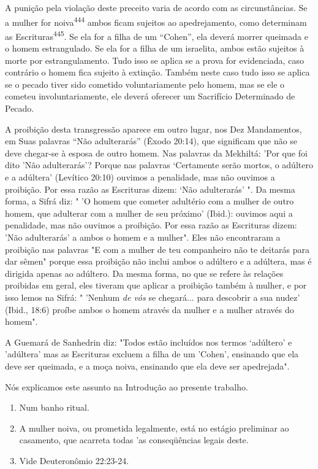 A punição pela violação deste preceito varia de acordo com as
cir­cunstâncias. Se a mulher for noiva\textsuperscript{444} ambos ficam
sujeitos ao apedrejamen­to, como determinam as
Escrituras\textsuperscript{445}. Se ela for a filha de um ``Cohen'', ela
deverá morrer queimada e o homem estrangulado. Se ela for a filha de um
is­raelita, ambos estão sujeitos à morte por estrangulamento. Tudo isso
se aplica se a prova for evidenciada, caso contrário o homem fica
sujeito à extinção. Tam­bém neste caso tudo isso se aplica se o pecado
tiver sido cometido voluntaria­mente pelo homem, mas se ele o cometeu
involuntariamente, ele deverá ofere­cer um Sacrifício Determinado de
Pecado.

A proibição desta transgressão aparece em outro lugar, nos Dez
Man­damentos, em Suas palavras ``Não adulterarás'' (Êxodo 20:14), que
significam que não se deve chegar-se à esposa de outro homem. Nas
palavras da Mekhiltá: 'Por que foi dito 'Não adulterarás'? Porque nas
palavras `Certamente serão mor­tos, o adúltero e a adúltera' (Levítico
20:10) ouvimos a penalidade, mas não ouvimos a proibição. Por essa razão
as Escrituras dizem: `Não adulterarás' ". Da mesma forma, a Sifrá diz: "
'O homem que cometer adultério com a mulher de outro homem, que
adulterar com a mulher de seu próximo' (Ibid.): ouvi­mos aqui a
penalidade, mas não ouvimos a proibição. Por essa razão as Escritu­ras
dizem: 'Não adulterarás' a ambos o homem e a mulher". Eles não
encontra­ram a proibição nas palavras "E com a mulher de teu companheiro
não te dei­tarás para dar sêmen" porque essa proibição não inclui ambos
o adúltero e a adúltera, mas é dirigida apenas ao adúltero. Da mesma
forma, no que se refere às relações proibidas em geral, eles tiveram que
aplicar a proibição também à mulher, e por isso lemos na Sifrá: "
'Nenhum \emph{de vós} se chegará... para desco­brir a sua nudez' (Ibid.,
18:6) proíbe ambos o homem através da mulher e a mulher através do
homem".

A Guemará de Sanhedrin diz: "Todos estão incluídos nos termos `adúltero'
e 'adúltera' mas as Escrituras excluem a filha de um 'Cohen', ensi­nando
que ela deve ser queimada, e a moça noiva, ensinando que ela deve ser
apedrejada".


Nós explicamos este assunto na Introdução ao presente trabalho.

\begin{enumerate}
\def\labelenumi{\arabic{enumi}.}
\setcounter{enumi}{442}
\item
 
 Num banho ritual.
 
\item
 
 A mulher noiva, ou prometida legalmente, está no estágio preliminar ao
 casamento, que acar­reta todas 'as conseqüências legais deste.
 
\item
 
 Vide Deuteronômio 22:23-24.
 
\end{enumerate}



